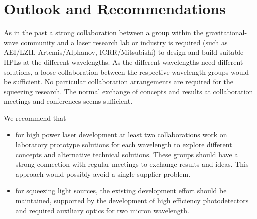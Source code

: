 \section{Outlook and Recommendations}
As in the past a strong collaboration between a group within the gravitational-wave community and a laser research lab or industry is required (such as AEI/LZH, Artemis/Alphanov, ICRR/Mitsubishi) to design and build suitable HPLs at the different wavelengths. As the different wavelengths need different solutions, a loose collaboration between the respective wavelength groups would be sufficient.  No particular collaboration arrangements are required for the squeezing research. The normal exchange of concepts and results at collaboration meetings and conferences seems sufficient. 

We recommend that
\begin{itemize}
\item for high power laser development at least two collaborations work on laboratory prototype solutions for each wavelength to explore different concepts and alternative technical solutions.  These groups should have a strong connection with regular meetings to exchange results and ideas. This approach would possibly avoid a single supplier problem.
\item for squeezing light sources, the existing development effort should be maintained, supported by the development of high efficiency photodetectors and required auxiliary optics for two micron wavelength.  
\end{itemize}

